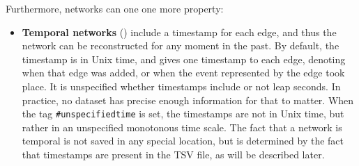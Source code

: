 \documentclass{article}
\begin{document}
Furthermore, networks can one one more property: 
\begin{itemize}
\item \textbf{Temporal networks} (\Clocklogo) include a timestamp for each
  edge, and thus the network can be reconstructed for any moment in the
  past.  By default, the timestamp is in Unix time, and gives one
  timestamp to each edge, denoting when that edge was added, or when the
  event represented by the edge took place.  
  It is unspecified whether timestamps include or not leap seconds.  In
  practice, no dataset has precise enough information for that to matter.
  When the tag
  \texttt{\#unspecifiedtime} is set, the timestamps are not in Unix
  time, but rather in an unspecified monotonous time scale. 
  The fact that a network is temporal is not saved in any special
  location, but is determined by the fact that timestamps are present in
  the TSV file, as will be described later. 
\end{itemize}
\end{document}
